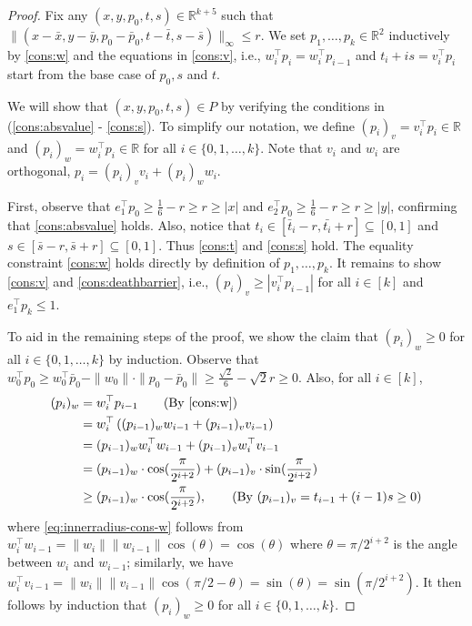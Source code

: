 \documentclass{theoretics}
\newcommand{\R}{\mathbb R}
\renewcommand{\subset}{\subseteq}
\begin{document}
\begin{proof}
    Fix any $(x, y, p_0, t, s) \in \R^{k + 5}$ such that $\|(x - \bar{x}, y - \bar{y}, p_0 - \bar{p}_0, t - \bar{t}, s - \bar{s})\|_\infty \leq r$. 
    We set $p_1, \ldots, p_k \in \R^2$ inductively by \eqref{cons:w} and the equations in \eqref{cons:v}, i.e.,
    $w_i^\top p_i = w_i^\top p_{i-1} $ and $t_i + is = v_i^\top p_i $ start from the base case of $p_0, s$ and $t$. 
    
    We will show that $(x, y, p_0, t, s) \in P$ by verifying the conditions in (\ref{cons:absvalue} - \ref{cons:s}).
    To simplify our notation, we define $(p_i)_v = v_i^\top p_i \in \R$ and $(p_i)_w = w_i^\top p_i \in \R$ for all $i \in \{0, 1, \ldots, k\}$. Note that $v_i$ and $w_i$ are orthogonal, $p_i = (p_i)_v v_i + (p_i)_w w_i$.
    
    First, observe that $e_1^\top p_0 \geq \frac{1}{6} - r \geq r \geq |x|$ and $e_2^\top p_0 \geq \frac{1}{6} - r \geq r \geq |y|$, confirming that \eqref{cons:absvalue} holds.
    Also, notice that $t_i \in [\bar{t}_i - r, \bar{t_i} + r] \subset [0, 1]$
     and $s \in [\bar{s} - r, \bar{s} + r] \subset [0, 1]$. Thus \eqref{cons:t} and \eqref{cons:s} hold. 
    The equality constraint \eqref{cons:w} holds directly by definition of $p_1,\ldots, p_k$.
    It remains to show \eqref{cons:v} and \eqref{cons:deathbarrier}, i.e., $ (p_i)_v \geq |v_i^\top p_{i-1}|$ for all $i \in [k]$ and $e_1^\top p_k \leq 1$.
    
    To aid in the remaining steps of the proof, we show the claim that $(p_i)_w \geq 0$
    for all $i \in \{0,1,\ldots,k\}$ by induction. Observe that
    $w_0^\top p_0 \geq w_0^\top \bar{p}_0 - \|w_0\|\cdot\|p_0 - \bar p_0\| \geq \frac{\sqrt{2}}{6} - \sqrt 2 r \geq 0$.
    Also, for all $i \in [k]$,
    \begin{align}
        (p_i)_w &= w_i^\top p_{i-1} \tag{By \eqref{cons:w}} \nonumber \\
        &= w_i^\top \left( (p_{i-1})_w w_{i-1} + (p_{i-1})_v v_{i-1} \right) \nonumber \\
        &= (p_{i-1})_w w_i^\top w_{i-1} + (p_{i-1})_v w_i^\top v_{i-1} \nonumber \\
        &= (p_{i-1})_w \cdot \cos(\frac{\pi}{2^{i+2}}) + (p_{i-1})_v \cdot \sin(\frac{\pi}{2^{i+2}}) \label{eq:innerradius-cons-w} \\
        &\geq (p_{i-1})_w \cdot \cos(\frac{\pi}{2^{i+2}}), \tag{By $(p_{i-1})_v = t_{i-1} + (i-1)s \geq 0$} \nonumber
    \end{align}
    where \eqref{eq:innerradius-cons-w} follows from $w_{i}^\top w_{i-1} = \|w_{i}\|\|w_{i-1}\| \cos(\theta) = \cos(\theta)$ where $\theta = \pi / 2^{i+2}$ is the angle between $w_i$ and $w_{i-1}$; similarly,  we have $w_{i}^\top v_{i-1} = \|w_{i}\|\|v_{i-1}\| \cos(\pi/2 - \theta) = \sin(\theta) = \sin (\pi / 2^{i+2})$. 
    It then follows by induction that $(p_i)_w \geq 0$ for all $i \in \{0,1,\ldots,k\}$.
    

\end{proof}
\end{document}
